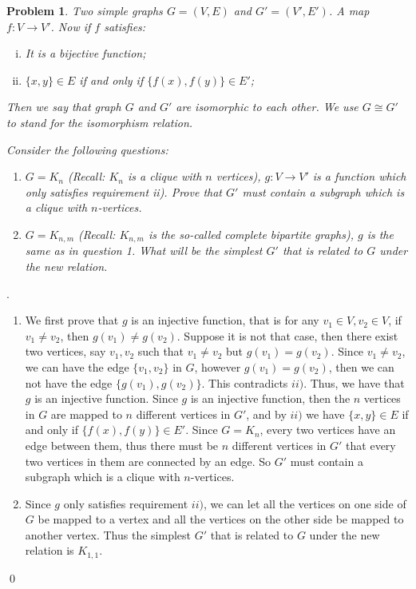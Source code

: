 \documentclass[12pt]{article}
\newtheorem{hw}{Problem}
\newenvironment{sol}
  {\par\vspace{3mm}\noindent{\it Solution}.}
  {\qed}
\begin{document}
\begin{hw}
\noindent Two simple graphs $G=(V,E)$ and $G'=(V',E')$. A map $f: V\rightarrow V'$. Now if $f$ satisfies:
\begin{enumerate}[i)]
  \item It is a bijective function;
  \item $\{x,y\}\in E$ if and only if $\{f(x), f(y)\}\in E'$;
\end{enumerate}
Then we say that graph $G$ and $G'$ are \emph{isomorphic} to each other. We use  $G\cong G'$ to stand for the isomorphism relation.

Consider the following questions:
\begin{enumerate}
  \item \label{q1}$G=K_n$ (Recall: $K_n$ is a clique with $n$ vertices), $g: V\rightarrow V'$ is a function which only satisfies requirement ii). Prove that $G'$ must contain a subgraph which is a clique with $n$-vertices.
  \item $G=K_{n,m}$ (Recall: $K_{n,m}$ is the so-called \emph{complete bipartite graphs}), $g$ is the same as in question 1.  What will be the simplest $G'$ that is related to $G$ under the new relation.
\end{enumerate}
\end{hw}
\begin{sol}
	\begin{enumerate}
		\item We first prove that $g$ is an injective function, that is for any $v_1 \in V, v_2 \in V$, if $v_1 \neq v_2$, then $g(v_1) \neq g(v_2)$. Suppose it is not that case, then there exist two vertices, say $v_1,v_2$ such that $v_1 \neq v_2$ but $g(v_1) = g(v_2)$. Since $v_1 \neq v_2$, we can have the edge $\{v_1,v_2\}$ in $G$, however $g(v_1) = g(v_2)$, then we can not have the edge $\{g(v_1),g(v_2)\}$. This contradicts $ii)$. Thus, we have that $g$ is an injective function. Since $g$ is an injective function, then the $n$ vertices in $G$ are mapped to $n$ different vertices in $G'$, and by $ii)$ we have $\{x,y\}\in E$ if and only if $\{f(x), f(y)\}\in E'$. Since $G=K_n$, every two vertices have an edge between them, thus there must be $n$ different vertices in $G'$ that every two vertices in them are connected by an edge. So $G'$ must contain a subgraph which is a clique with $n$-vertices.
		
		\item Since $g$ only satisfies requirement $ii)$, we can let all the vertices on one side of $G$ be mapped to a vertex and all the vertices on the other side be mapped to another vertex. Thus the simplest $G'$ that is related to $G$ under the new relation is $K_{1,1}$.
	\end{enumerate}
\end{sol}
\end{document}
